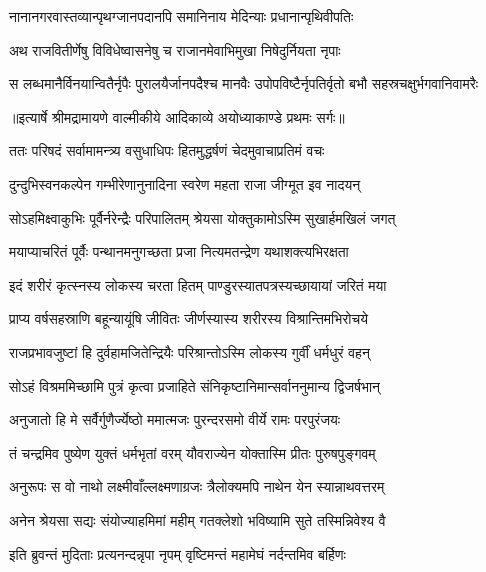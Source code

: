 \twolineshloka
{नानानगरवास्तव्यान्पृथग्जानपदानपि}
{समानिनाय मेदिन्याः प्रधानान्पृथिवीपतिः} %

\twolineshloka
{अथ राजवितीर्णेषु विविधेष्वासनेषु च}
{राजानमेवाभिमुखा निषेदुर्नियता नृपाः} %

\fourlineindentedshloka
{स लब्धमानैर्विनयान्वितैर्नृपैः}
{पुरालयैर्जानपदैश्च मानवैः}
{उपोपविष्टैर्नृपतिर्वृतो बभौ}
{सहस्रचक्षुर्भगवानिवामरैः} %


{॥इत्यार्षे श्रीमद्रामायणे वाल्मीकीये आदिकाव्ये अयोध्याकाण्डे प्रथमः सर्गः॥}


\twolineshloka
{ततः परिषदं सर्वामामन्त्र्य वसुधाधिपः}
{हितमुद्धर्षणं चेदमुवाचाप्रतिमं वचः} %

\twolineshloka
{दुन्दुभिस्वनकल्पेन गम्भीरेणानुनादिना}
{स्वरेण महता राजा जीग्मूत इव नादयन्} %

\twolineshloka
{सोऽहमिक्ष्वाकुभिः पूर्वैर्नरेन्द्रैः परिपालितम्}
{श्रेयसा योक्तुकामोऽस्मि सुखार्हमखिलं जगत्} %

\twolineshloka
{मयाप्याचरितं पूर्वैः पन्थानमनुगच्छता}
{प्रजा नित्यमतन्द्रेण यथाशक्त्यभिरक्षता} %

\twolineshloka
{इदं शरीरं कृत्स्नस्य लोकस्य चरता हितम्}
{पाण्डुरस्यातपत्रस्यच्छायायां जरितं मया} %

\twolineshloka
{प्राप्य वर्षसहस्राणि बहून्यायूंषि जीवितः}
{जीर्णस्यास्य शरीरस्य विश्रान्तिमभिरोचये} %

\twolineshloka
{राजप्रभावजुष्टां हि दुर्वहामजितेन्द्रियैः}
{परिश्रान्तोऽस्मि लोकस्य गुर्वीं धर्मधुरं वहन्} %

\twolineshloka
{सोऽहं विश्रममिच्छामि पुत्रं कृत्वा प्रजाहिते}
{संनिकृष्टानिमान्सर्वाननुमान्य द्विजर्षभान्} %

\twolineshloka
{अनुजातो हि मे सर्वैर्गुणैर्ज्येष्ठो ममात्मजः}
{पुरन्दरसमो वीर्ये रामः परपुरंजयः} %

\twolineshloka
{तं चन्द्रमिव पुष्येण युक्तं धर्मभृतां वरम्}
{यौवराज्येन योक्तास्मि प्रीतः पुरुषपुङ्गवम्} %

\twolineshloka
{अनुरूपः स वो नाथो लक्ष्मीवाँल्लक्ष्मणाग्रजः}
{त्रैलोक्यमपि नाथेन येन स्यान्नाथवत्तरम्} %

\twolineshloka
{अनेन श्रेयसा सद्यः संयोज्याहमिमां महीम्}
{गतक्लेशो भविष्यामि सुते तस्मिन्निवेश्य वै} %

\twolineshloka
{इति ब्रुवन्तं मुदिताः प्रत्यनन्दन्नृपा नृपम्}
{वृष्टिमन्तं महामेघं नर्दन्तमिव बर्हिणः} %

